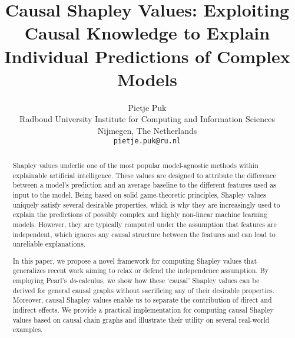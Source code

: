 \documentclass{article}
\title{Causal Shapley Values: Exploiting Causal Knowledge to Explain Individual Predictions of Complex Models}
\author{%
  Pietje Puk\\
  Radboud University
  Institute for Computing and Information Sciences\\
  Nijmegen, The Netherlands \\
  \texttt{pietje.puk@ru.nl} \\
}
\begin{document}
\maketitle

\begin{abstract}
Shapley values underlie one of the most popular model-agnostic methods within explainable artificial intelligence. These values are designed to attribute the difference between a model's prediction and an average baseline to the different features used as input to the model. Being based on solid game-theoretic principles, Shapley values uniquely satisfy several desirable properties, which is why they are increasingly used to explain the predictions of possibly complex and highly non-linear machine learning models. However, they are typically computed under the assumption that features are independent, which ignores any causal structure between the features and can lead to unreliable explanations.

In this paper, we propose a novel framework for computing Shapley values that generalizes recent work aiming to relax or defend the independence assumption. By employing Pearl's \textit{do}-calculus, we show how these `causal' Shapley values can be derived for general causal graphs without sacrificing any of their desirable properties. Moreover, causal Shapley values enable us to separate the contribution of direct and indirect effects. We provide a practical implementation for computing causal Shapley values based on causal chain graphs and illustrate their utility on several real-world examples.
\end{abstract}






\end{document}
